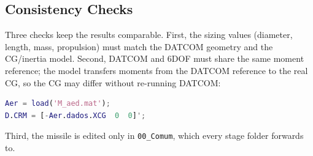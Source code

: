 \subsection{Consistency Checks}

Three checks keep the results comparable. First, the sizing values (diameter, length, mass, propulsion) must match the DATCOM geometry and the CG/inertia model. Second, DATCOM and 6DOF must share the same moment reference; the model transfers moments from the DATCOM reference to the real CG, so the CG may differ without re-running DATCOM:

\begin{lstlisting}[language=Matlab]
Aer = load('M_aed.mat');
D.CRM = [-Aer.dados.XCG  0  0]';
\end{lstlisting}

Third, the missile is edited only in \texttt{00\_Comum}, which every stage folder forwards to.
